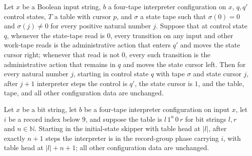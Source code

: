\begin{lemma}
\label{Turing.universal_state_rewind}
\leanok
{}
Let $x$ be a Boolean input string, $b$ a four-tape interpreter configuration on $x$,
$q,q'$ control states, $T$ a table with cursor $p$, and $\sigma$ a state tape such that
$\sigma(0)=0$ and $\sigma(j)\ne0$ for every positive natural number $j$. Suppose that at
control state $q$, whenever the state-tape read is $0$, every transition on any input
and other work-tape reads is the administrative action that enters $q'$ and moves the
state cursor right; whenever that read is not $0$, every such transition is the
administrative action that remains in $q$ and moves the state cursor left. Then for
every natural number $j$, starting in control state $q$ with tape $\sigma$ and state
cursor $j$, after $j+1$ interpreter steps the control is $q'$, the state cursor is $1$,
and the table, tape, and all other configuration data are unchanged.
\end{lemma}

\begin{lemma}
\label{Turing.universal_initial_skip}
\leanok
{}
Let $x$ be a bit string, let $b$ be a four-tape interpreter configuration on input $x$,
let $i$ be a record index below $9$, and suppose the table is $l\,1^n\,0\,r$ for bit
strings $l,r$ and $n\in\mathbb{N}$. Starting in the initial-state skipper with table
head at $|l|$, after exactly $n+1$ steps the interpreter is in the record-group phase
carrying $i$, with table head at $|l|+n+1$; all other configuration data are unchanged.
\end{lemma}

